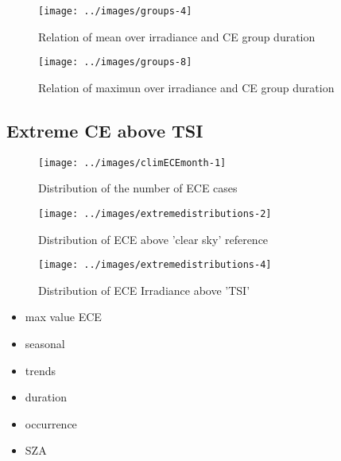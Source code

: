 \documentclass[
]{article}
\providecommand{\tightlist}{%
  \setlength{\itemsep}{0pt}\setlength{\parskip}{0pt}}
\begin{document}
\begin{figure}[h!]

{\centering \texttt{[image: ../images/groups-4]} 

}

\caption{Relation of mean over irradiance and CE group duration}\label{fig:unnamed-chunk-7}
\end{figure}

\begin{figure}[h!]

{\centering \texttt{[image: ../images/groups-8]} 

}

\caption{Relation of maximun over irradiance and CE group duration}\label{fig:unnamed-chunk-8}
\end{figure}

\FloatBarrier

\hypertarget{extreme-ce-above-tsi}{%
\subsection{Extreme CE above TSI}\label{extreme-ce-above-tsi}}

\begin{figure}[h!]

{\centering \texttt{[image: ../images/climECEmonth-1]} 

}

\caption{Distribution of the number of ECE cases}\label{fig:unnamed-chunk-9}
\end{figure}

\begin{figure}[h!]

{\centering \texttt{[image: ../images/extremedistributions-2]} 

}

\caption{Distribution of ECE above 'clear sky' reference}\label{fig:unnamed-chunk-10}
\end{figure}

\begin{figure}[h!]

{\centering \texttt{[image: ../images/extremedistributions-4]} 

}

\caption{Distribution of ECE Irradiance above 'TSI'}\label{fig:unnamed-chunk-11}
\end{figure}

\begin{itemize}
\tightlist
\item
  max value ECE
\item
  seasonal
\item
  trends
\item
  duration
\item
  occurrence
\item
  SZA
\end{itemize}
\end{document}
